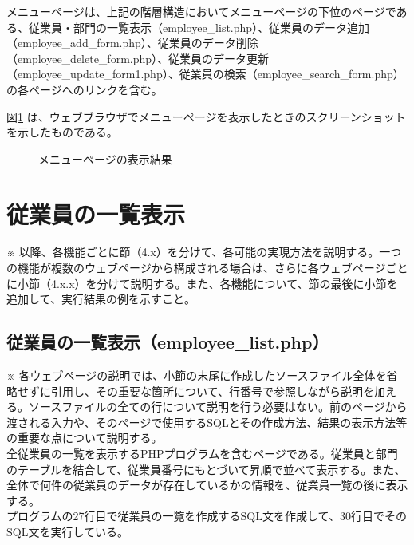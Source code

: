 \documentclass[a4j,12pt]{jreport}
\begin{document}
メニューページは、上記の階層構造においてメニューページの下位のページである、従業員・部門の一覧表示（employee\_list.php）、従業員のデータ追加（employee\_add\_form.php）、従業員のデータ削除（employee\_delete\_form.php）、従業員のデータ更新（employee\_update\_form1.php）、従業員の検索（employee\_search\_form.php）の各ページへのリンクを含む。



図\ref{fig:menu} は、ウェブブラウザでメニューページを表示したときのスクリーンショットを示したものである。

\begin{figure}[h]
	\begin{center}
	\end{center}
	\caption{メニューページの表示結果
	}
	\label{fig:menu}
\end{figure}


\section{従業員の一覧表示}

※ 以降、各機能ごとに節（4.x）を分けて、各可能の実現方法を説明する。一つの機能が複数のウェブページから構成される場合は、さらに各ウェブページごとに小節（4.x.x）を分けて説明する。また、各機能について、節の最後に小節を追加して、実行結果の例を示すこと。

\subsection{従業員の一覧表示（employee\_list.php）}

※ 各ウェブページの説明では、小節の末尾に作成したソースファイル全体を省略せずに引用し、その重要な箇所について、行番号で参照しながら説明を加える。ソースファイルの全ての行について説明を行う必要はない。前のページから渡される入力や、そのページで使用するSQLとその作成方法、結果の表示方法等の重要な点について説明する。\\

全従業員の一覧を表示するPHPプログラムを含むページである。従業員と部門のテーブルを結合して、従業員番号にもとづいて昇順で並べて表示する。また、全体で何件の従業員のデータが存在しているかの情報を、従業員一覧の後に表示する。\\

プログラムの27行目で従業員の一覧を作成するSQL文を作成して、30行目でそのSQL文を実行している。\\
\end{document}
